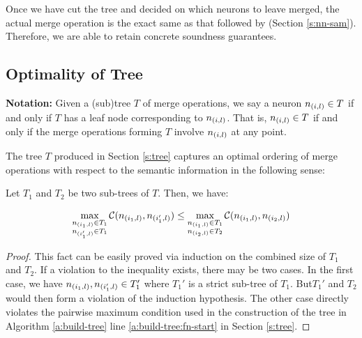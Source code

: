 Once we have cut the tree and decided on which neurons to leave merged, the
actual merge operation is the exact same as that followed by \cite{cegar-nn}
(Section \ref{s:nn-sam}). Therefore, we are able to retain concrete soundness
guarantees.



\subsection{Optimality of Tree}
\label{s:optimal-tree}

\textbf{Notation:} Given a (sub)tree $T$ of
merge operations, we say a neuron $n_{(i,l)} \in T$ if and only if $T$ has a
leaf node corresponding to $n_{(i,l)}$. That is, $n_{(i,l)} \in T$ if and only
if the merge operations forming $T$ involve $n_{(i,l)}$ at any point.

The tree $T$ produced in Section \ref{s:tree} captures an optimal ordering of
merge operations with respect to the semantic information in the following
sense:

\begin{lemma}
Let $T_1$ and $T_2$ be two sub-trees of $T$. Then, we have:

\begin{equation*}
\begin{aligned}
    \max_{ \substack{ n_{(i_1,l)} \in T_1 \\ n_{(i_1',l)} \in T_1 }} 
    \mathcal{C}( n_{(i_1,l)}, n_{(i_1',l)} ) \leq
    \max_{ \substack{ n_{(i_1,l)} \in T_1 \\ n_{(i_2,l)} \in T_2 }} 
    \mathcal{C}( n_{(i_1,l)}, n_{(i_2,l)} )
\end{aligned}
\end{equation*}

\end{lemma}
\begin{proof}
This fact can be easily proved via induction on the combined size of $T_1$ and
$T_2$. If a violation to the inequality exists, there may be two cases. In the
first case, we have $n_{(i_1,l)}, n_{(i_1',l)} \in T_1'$ where $T_1'$ is a
strict sub-tree of $T_1$. But$T_1'$ and $T_2$ would then form a violation of the
induction hypothesis. The other case directly violates the pairwise maximum
condition  used in the construction of the
tree in Algorithm \ref{a:build-tree} line \ref{a:build-tree:fn-start}
in Section \ref{s:tree}.
\end{proof}

